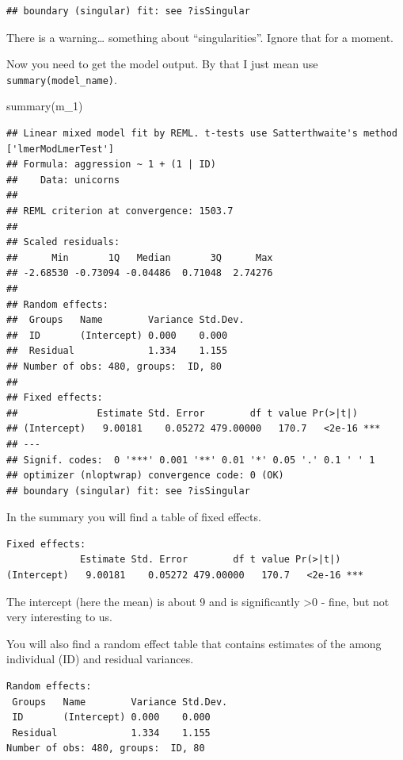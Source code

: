 \documentclass[
  12pt,
]{book}
\newenvironment{Shaded}{\begin{snugshade}}{\end{snugshade}}
\newcommand{\FunctionTok}[1]{\textcolor[rgb]{0.00,0.00,0.00}{#1}}
\newcommand{\NormalTok}[1]{#1}
\begin{document}
\begin{verbatim}
## boundary (singular) fit: see ?isSingular
\end{verbatim}

There is a warning\ldots{} something about ``singularities''. Ignore that for a moment.

Now you need to get the model output. By that I just mean use \texttt{summary(model\_name)}.

\begin{Shaded}
\begin{Highlighting}[]
\FunctionTok{summary}\NormalTok{(m\_1)}
\end{Highlighting}
\end{Shaded}

\begin{verbatim}
## Linear mixed model fit by REML. t-tests use Satterthwaite's method ['lmerModLmerTest']
## Formula: aggression ~ 1 + (1 | ID)
##    Data: unicorns
## 
## REML criterion at convergence: 1503.7
## 
## Scaled residuals: 
##      Min       1Q   Median       3Q      Max 
## -2.68530 -0.73094 -0.04486  0.71048  2.74276 
## 
## Random effects:
##  Groups   Name        Variance Std.Dev.
##  ID       (Intercept) 0.000    0.000   
##  Residual             1.334    1.155   
## Number of obs: 480, groups:  ID, 80
## 
## Fixed effects:
##              Estimate Std. Error        df t value Pr(>|t|)    
## (Intercept)   9.00181    0.05272 479.00000   170.7   <2e-16 ***
## ---
## Signif. codes:  0 '***' 0.001 '**' 0.01 '*' 0.05 '.' 0.1 ' ' 1
## optimizer (nloptwrap) convergence code: 0 (OK)
## boundary (singular) fit: see ?isSingular
\end{verbatim}

In the summary you will find a table of fixed effects.

\begin{verbatim}
Fixed effects:
             Estimate Std. Error        df t value Pr(>|t|)    
(Intercept)   9.00181    0.05272 479.00000   170.7   <2e-16 ***
\end{verbatim}

The intercept (here the mean) is about 9 and is significantly \textgreater0 - fine, but not very interesting to us.

You will also find a random effect table that contains estimates of the among individual (ID) and residual variances.

\begin{verbatim}
Random effects:
 Groups   Name        Variance Std.Dev.
 ID       (Intercept) 0.000    0.000   
 Residual             1.334    1.155   
Number of obs: 480, groups:  ID, 80
\end{verbatim}
\end{document}
